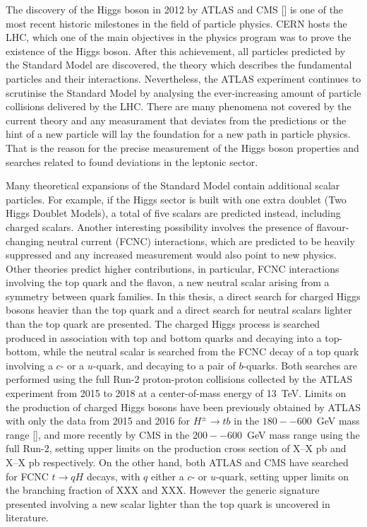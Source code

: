 The discovery of the Higgs boson in 2012 by ATLAS and CMS [] is one of the most recent historic milestones in the field of particle physics. CERN hosts the LHC, which one of the main objectives in the physics program was to prove the existence of the Higgs boson. After this achievement, all particles predicted by the Standard Model are discovered, the theory which describes the fundamental particles and their interactions. Nevertheless, the ATLAS experiment continues to scrutinise the Standard Model by analysing the ever-increasing amount of particle collisions delivered by the LHC. There are many phenomena not covered by the current theory and any measurament that deviates from the predictions or the hint of a new particle will lay the foundation for a new path in particle physics. That is the reason for the precise measurement of the Higgs boson properties and searches related to found deviations in the leptonic sector.

Many theoretical expansions of the Standard Model contain additional scalar particles. For example, if the Higgs sector is built with one extra doublet (Two Higgs Doublet Models), a total of five scalars are predicted instead, including charged scalars. Another interesting possibility involves the presence of flavour-changing neutral current (FCNC) interactions, which are predicted to be heavily suppressed and any increased measurement would also point to new physics. Other theories predict higher contributions, in particular, FCNC interactions involving the top quark and the flavon, a new neutral scalar arising from a symmetry between quark families.
In this thesis, a direct search for charged Higgs bosons heavier than the top quark and a direct search for neutral scalars lighter than the top quark are presented. The charged Higgs process is searched produced in association with top and bottom quarks and decaying into a top-bottom, while the neutral scalar is searched from the FCNC decay of a top quark involving a $c$- or a $u$-quark, and decaying to a pair of $b$-quarks. Both searches are performed using the full Run-2 proton-proton collisions collected by the ATLAS experiment from 2015 to 2018 at a center-of-mass energy of 13~TeV. Limits on the production of charged Higgs bosons have been previously obtained by ATLAS with only the data from 2015 and 2016 for $H^\pm\to tb$ in the $180--600$~GeV mass range [], and more recently by CMS in the $200--600$~GeV mass range using the full Run-2, setting upper limits on the production cross section of X--X pb and X--X pb respectively. On the other hand, both ATLAS and CMS have searched for FCNC $t\to qH$ decays, with $q$ either a $c$- or $u$-quark, setting upper limits on the branching fraction of XXX and XXX. However the generic signature presented involving a new scalar lighter than the top quark is uncovered in literature.


